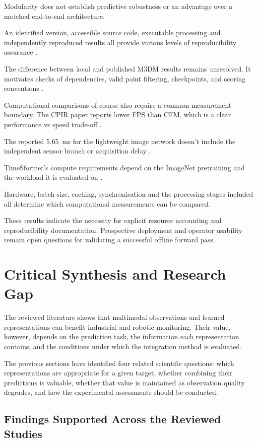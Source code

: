 Modularity does not establish predictive robustness or an advantage over a matched end-to-end
architecture.

An identified version, accessible source code, executable processing and independently reproduced
results all provide various levels of reproducibility assurance \parencite{P009}.

The difference between local and published M3DM results remains unresolved. It motivates checks of
dependencies, valid point filtering, checkpoints, and scoring conventions \parencite{P033}.

Computational comparisons of course also require a common measurement boundary. The CPIR paper
reports lower FPS than CFM, which is a clear performance vs speed trade-off
\parencite{Shangguan2025CPIR}.

The reported 5.65~ms for the lightweight image network doesn't include the independent sensor branch
or acquisition delay \parencite[Table~V]{P035}.

TimeSformer's compute requirements depend on the ImageNet pretraining and the workload it is
evaluated on \parencite{P034}.

Hardware, batch size, caching, synchronisation and the processing stages included all determine
which computational measurements can be compared.

These results indicate the necessity for explicit resource accounting and reproducibility
documentation. Prospective deployment and operator usability remain open questions for validating a
successful offline forward pass.

\section{Critical Synthesis and Research Gap}

The reviewed literature shows that multimodal observations and learned representations can benefit
industrial and robotic monitoring. Their value, however, depends on the prediction task, the
information each representation contains, and the conditions under which the integration method is
evaluated.

The previous sections have identified four related scientific questions: which representations are
appropriate for a given target, whether combining their predictions is valuable, whether that value
is maintained as observation quality degrades, and how the experimental assessments should be
conducted.

\subsection{Findings Supported Across the Reviewed Studies}

